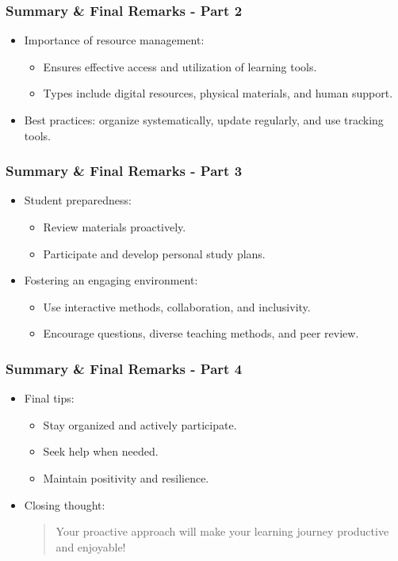 \documentclass{beamer}
\begin{document}
\begin{frame}[fragile]
  \frametitle{Summary \& Final Remarks - Part 2}
  \begin{itemize}
    \item Importance of resource management:
    \begin{itemize}
      \item Ensures effective access and utilization of learning tools.
      \item Types include digital resources, physical materials, and human support.
    \end{itemize}
    \item Best practices: organize systematically, update regularly, and use tracking tools.
  \end{itemize}
\end{frame}

\begin{frame}[fragile]
  \frametitle{Summary \& Final Remarks - Part 3}
  \begin{itemize}
    \item Student preparedness:
    \begin{itemize}
      \item Review materials proactively.
      \item Participate and develop personal study plans.
    \end{itemize}
    \item Fostering an engaging environment:
    \begin{itemize}
      \item Use interactive methods, collaboration, and inclusivity.
      \item Encourage questions, diverse teaching methods, and peer review.
    \end{itemize}
  \end{itemize}
\end{frame}

\begin{frame}[fragile]
  \frametitle{Summary \& Final Remarks - Part 4}
  \begin{itemize}
    \item Final tips:
    \begin{itemize}
      \item Stay organized and actively participate.
      \item Seek help when needed.
      \item Maintain positivity and resilience.
    \end{itemize}
    \item Closing thought:
    \begin{quote}
      Your proactive approach will make your learning journey productive and enjoyable!
    \end{quote}
  \end{itemize}
\end{frame}
\end{document}
